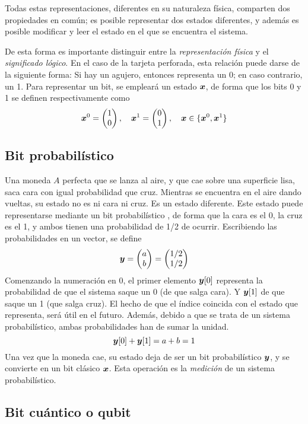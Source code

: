 Todas estas representaciones, diferentes en su naturaleza física, comparten dos 
propiedades en común; es posible representar dos estados diferentes, y además es 
posible modificar y leer el estado en el que se encuentra el sistema.

De esta forma es importante distinguir entre la \textit{representación física} y 
el \textit{significado lógico}. En el caso de la tarjeta perforada, esta 
relación puede darse de la siguiente forma: Si hay un agujero, entonces 
representa un 0; en caso contrario, un 1. Para representar un bit, se empleará 
un estado $\boldsymbol{x}$, de forma que los bits 0 y 1 se definen respectivamente como
$$ \boldsymbol{x}^0 = \begin{pmatrix} 1 \\ 0 \end{pmatrix}, \quad \boldsymbol{x}^1 = \begin{pmatrix} 0 \\ 1 \end{pmatrix}, \quad
\boldsymbol{x} \in \{\boldsymbol{x}^0, \boldsymbol{x}^1\} $$


\subsection{Bit probabilístico}

Una moneda $A$ perfecta que se lanza al aire, y que cae sobre una superficie 
lisa, saca cara con igual probabilidad que cruz. Mientras se encuentra en el 
aire dando vueltas, su estado no es ni cara ni cruz. Es un estado diferente.  
Este estado puede representarse mediante un bit probabilístico \cite{watrous}, 
de forma que la cara es el 0, la cruz es el 1, y ambos tienen una probabilidad 
de 1/2 de ocurrir.  Escribiendo las probabilidades en un vector, se define
%
$$ \boldsymbol{y} = \begin{pmatrix} a \\ b \end{pmatrix} = \begin{pmatrix} 1/2 \\ 1/2 \end{pmatrix} $$
%
Comenzando la numeración en 0, el primer elemento $\boldsymbol{y} [0]$ representa la 
probabilidad de que el sistema saque un 0 (de que salga cara). Y $\boldsymbol{y} [1]$ de 
que saque un 1 (que salga cruz). El hecho de que el índice coincida con el 
estado que representa, será útil en el futuro.
%
Además, debido a que se trata de un sistema probabilístico, ambas probabilidades 
han de sumar la unidad.
%
$$ \boldsymbol{y} [0] + \boldsymbol{y} [1] = a + b = 1 $$
%
Una vez que la moneda cae, su estado deja de ser un bit probabilístico $\boldsymbol{y}$, y 
se convierte en un bit clásico $\boldsymbol{x}$. Esta operación es la \textit{medición} de 
un sistema probabilístico.

\subsection{Bit cuántico o qubit}

